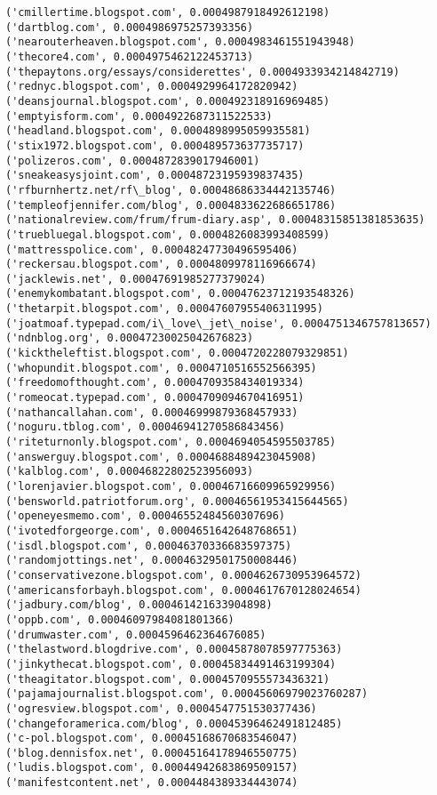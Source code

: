 \documentclass[11pt]{article}
\begin{document}
\begin{Verbatim}[commandchars=\\\{\}]
('cmillertime.blogspot.com', 0.0004987918492612198)
('dartblog.com', 0.0004986975257393356)
('nearouterheaven.blogspot.com', 0.0004983461551943948)
('thecore4.com', 0.0004975462122453713)
('thepaytons.org/essays/considerettes', 0.0004933934214842719)
('rednyc.blogspot.com', 0.0004929964172820942)
('deansjournal.blogspot.com', 0.000492318916969485)
('emptyisform.com', 0.0004922687311522533)
('headland.blogspot.com', 0.0004898995059935581)
('stix1972.blogspot.com', 0.000489573637735717)
('polizeros.com', 0.0004872839017946001)
('sneakeasysjoint.com', 0.00048723195939837435)
('rfburnhertz.net/rf\_blog', 0.00048686334442135746)
('templeofjennifer.com/blog', 0.0004833622686651786)
('nationalreview.com/frum/frum-diary.asp', 0.00048315851381853635)
('truebluegal.blogspot.com', 0.0004826083993408599)
('mattresspolice.com', 0.00048247730496595406)
('reckersau.blogspot.com', 0.0004809978116966674)
('jacklewis.net', 0.00047691985277379024)
('enemykombatant.blogspot.com', 0.00047623712193548326)
('thetarpit.blogspot.com', 0.00047607955406311995)
('joatmoaf.typepad.com/i\_love\_jet\_noise', 0.0004751346757813657)
('ndnblog.org', 0.00047230025042676823)
('kicktheleftist.blogspot.com', 0.0004720228079329851)
('whopundit.blogspot.com', 0.0004710516552566395)
('freedomofthought.com', 0.0004709358434019334)
('romeocat.typepad.com', 0.0004709094670416951)
('nathancallahan.com', 0.00046999879368457933)
('noguru.tblog.com', 0.00046941270586843456)
('riteturnonly.blogspot.com', 0.0004694054595503785)
('answerguy.blogspot.com', 0.0004688489423045908)
('kalblog.com', 0.00046822802523956093)
('lorenjavier.blogspot.com', 0.00046716609965929956)
('bensworld.patriotforum.org', 0.00046561953415644565)
('openeyesmemo.com', 0.00046552484560307696)
('ivotedforgeorge.com', 0.0004651642648768651)
('isdl.blogspot.com', 0.00046370336683597375)
('randomjottings.net', 0.00046329501750008446)
('conservativezone.blogspot.com', 0.0004626730953964572)
('americansforbayh.blogspot.com', 0.0004617670128024654)
('jadbury.com/blog', 0.000461421633904898)
('oppb.com', 0.00046097984081801366)
('drumwaster.com', 0.0004596462364676085)
('thelastword.blogdrive.com', 0.00045878078597775363)
('jinkythecat.blogspot.com', 0.00045834491463199304)
('theagitator.blogspot.com', 0.0004570955573436321)
('pajamajournalist.blogspot.com', 0.00045606979023760287)
('ogresview.blogspot.com', 0.0004547751530377436)
('changeforamerica.com/blog', 0.00045396462491812485)
('c-pol.blogspot.com', 0.00045168670683546047)
('blog.dennisfox.net', 0.00045164178946550775)
('ludis.blogspot.com', 0.00044942683869509157)
('manifestcontent.net', 0.0004484389334443074)

\end{Verbatim}
\end{document}
